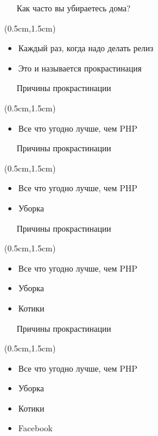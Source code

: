 \documentclass[xetex,18pt,aspectratio=43]{beamer}
\begin{document}
\begin{Large}
\begin{frame}{\ \ \ Как часто вы убираетесь дома?}
\begin{textblock*}{\framewidth-0.8cm}(0.5cm,1.5cm)
\begin{itemize}
  \item Каждый раз, когда надо делать релиз
  \item Это и называется прокрастинация
\end{itemize}
\end{textblock*}
\end{frame}

\begin{frame}{\ \ \ Причины прокрастинации}
\begin{textblock*}{\framewidth-0.8cm}(0.5cm,1.5cm)
\begin{itemize}
  \item Все что угодно лучше, чем PHP
\end{itemize}
\end{textblock*}
\end{frame}

\begin{frame}{\ \ \ Причины прокрастинации}
\begin{textblock*}{\framewidth-0.8cm}(0.5cm,1.5cm)
\begin{itemize}
  \item Все что угодно лучше, чем PHP
  \item Уборка
\end{itemize}
\end{textblock*}
\end{frame}

\begin{frame}{\ \ \ Причины прокрастинации}
\begin{textblock*}{\framewidth-0.8cm}(0.5cm,1.5cm)
\begin{itemize}
  \item Все что угодно лучше, чем PHP
  \item Уборка
  \item Котики
\end{itemize}
\end{textblock*}
\end{frame}

\begin{frame}{\ \ \ Причины прокрастинации}
\begin{textblock*}{\framewidth-0.8cm}(0.5cm,1.5cm)
\begin{itemize}
  \item Все что угодно лучше, чем PHP
  \item Уборка
  \item Котики
  \item Facebook
\end{itemize}
\end{textblock*}
\end{frame}


\end{Large}
\end{document}
